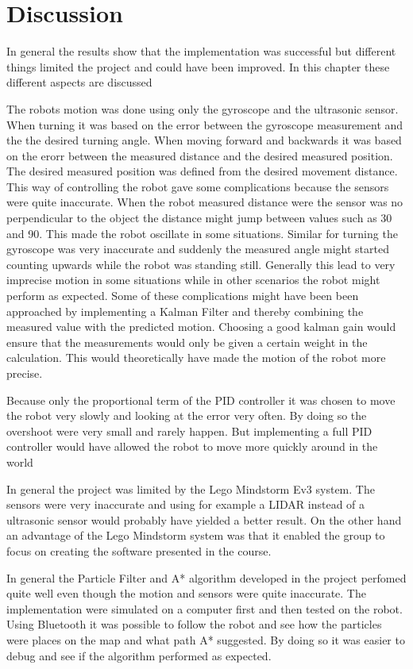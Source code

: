 \chapter{Discussion}
\label{chp:disc}
In general the results show that the implementation was successful but different things limited the project and could have been improved. In this chapter these different aspects are discussed

The robots motion was done using only the gyroscope and the ultrasonic sensor. When turning it was based on the error between the gyroscope measurement and the the desired turning angle. When moving forward and backwards it was based on the erorr between the measured distance and the desired measured position. The desired measured position was defined from the desired movement distance. This way of controlling the robot gave some complications because the sensors were quite inaccurate. When the robot measured distance were the sensor was no perpendicular to the object the distance might jump between values such as 30 and 90. This made the robot oscillate in some situations. Similar for turning the gyroscope was very inaccurate and suddenly the measured angle might started counting upwards while the robot was standing still. Generally this lead to very imprecise motion in some situations while in other scenarios the robot might perform as expected. Some of these complications might have been been approached by implementing a Kalman Filter and thereby combining the measured value with the predicted motion. Choosing a good kalman gain would ensure that the measurements would only be given a certain weight in the calculation. This would theoretically have made the motion of the robot more precise.

Because only the proportional term of the PID controller it was chosen to move the robot very slowly and looking at the error very often. By doing so the overshoot were very small and rarely happen. But implementing a full PID controller would have allowed the robot to move more quickly around in the world

In general the project was limited by the Lego Mindstorm Ev3 system. The sensors were very inaccurate and using for example a LIDAR instead of a ultrasonic sensor would probably have yielded a better result. On the other hand an advantage of the Lego Mindstorm system was that it enabled the group to focus on creating the software presented in the course.

In general the Particle Filter and A* algorithm developed in the project perfomed quite well even though the motion and sensors were quite inaccurate. The implementation were simulated on a computer first and then tested on the robot. Using Bluetooth it was possible to follow the robot and see how the particles were places on the map and what path A* suggested. By doing so it was easier to debug and see if the algorithm performed as expected.